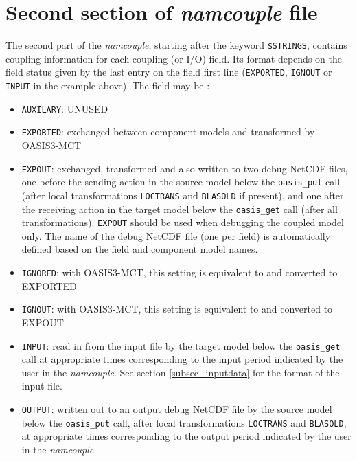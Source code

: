 
\section{Second section of {\it namcouple} file }
\label{subsec_namcouplesecond}

The second part of the {\it namcouple}, starting after the keyword
{\tt \$STRINGS}, contains coupling information for each coupling (or
I/O) field.  Its format depends on the field status given by the last
entry on the field first line ({\tt EXPORTED}, {\tt IGNOUT} or {\tt
  INPUT} in the example above). The field may be :

\begin{itemize}
\item {\tt AUXILARY}: UNUSED
\item {\tt EXPORTED}: exchanged between component models and
  transformed by OASIS3-MCT
\item {\tt EXPOUT}: exchanged, transformed and also written to two
  debug NetCDF files, one before the sending action in the source
  model below the {\tt oasis\_put} call (after local transformations
  {\tt LOCTRANS} and {\tt BLASOLD} if present), and one after the
  receiving action in the target model below the {\tt oasis\_get} call
  (after all transformations). {\tt EXPOUT} should be used when
  debugging the coupled model only. The name of the debug NetCDF file
  (one per field) is automatically defined based on the field and
  component model names.
\item {\tt IGNORED}: with OASIS3-MCT, this setting is equivalent to
  and converted to EXPORTED
\item {\tt IGNOUT}: with OASIS3-MCT, this setting is equivalent to and
  converted to EXPOUT
\item {\tt INPUT}: read in from the input file by the target model
  below the {\tt oasis\_get} call at
  appropriate times corresponding to the input period indicated by the
  user in the {\it namcouple}. See section \ref{subsec_inputdata} for
  the format of the input file.
\item {\tt OUTPUT}: written out to an output debug NetCDF file by the
  source model below the {\tt oasis\_put} call, after local
  transformations {\tt LOCTRANS} and {\tt BLASOLD}, at appropriate
  times corresponding to the output period indicated by the user in
  the {\it namcouple}.

\end{itemize}

